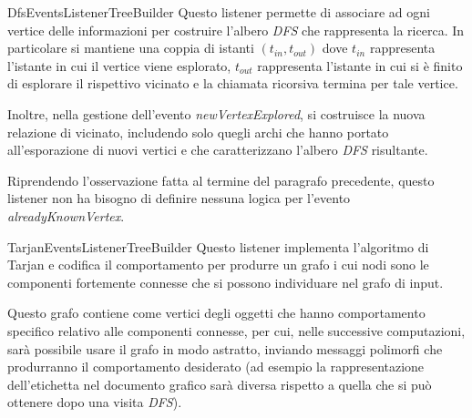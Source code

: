 \begin{paragraph}{DfsEventsListenerTreeBuilder}
  Questo listener permette di associare ad ogni vertice delle
  informazioni per costruire l'albero \emph{DFS} che rappresenta la
  ricerca. In particolare si mantiene una coppia di istanti $(t_{in},
  t_{out})$ dove $t_{in}$ rappresenta l'istante in cui il vertice
  viene esplorato, $t_{out}$ rappresenta l'istante in cui si \`e
  finito di esplorare il rispettivo vicinato e la chiamata ricorsiva
  termina per tale vertice.

  Inoltre, nella gestione dell'evento \emph{newVertexExplored}, si
  costruisce la nuova relazione di vicinato, includendo solo quegli
  archi che hanno portato all'esporazione di nuovi vertici e che
  caratterizzano l'albero \emph{DFS} risultante.

  Riprendendo l'osservazione fatta al termine del paragrafo
  precedente, questo listener non ha bisogno di definire nessuna
  logica per l'evento \emph{alreadyKnownVertex}.
\end{paragraph}

\begin{paragraph}{TarjanEventsListenerTreeBuilder}
  Questo listener implementa l'algoritmo di Tarjan e codifica il
  comportamento per produrre un grafo i cui nodi sono le componenti
  fortemente connesse che si possono individuare nel grafo di
  input. 

  Questo grafo contiene come vertici degli oggetti che hanno
  comportamento specifico relativo alle componenti connesse, per cui,
  nelle successive computazioni, sar\`a possibile usare il grafo in
  modo astratto, inviando messaggi polimorfi che produrranno il
  comportamento desiderato (ad esempio la rappresentazione
  dell'etichetta nel documento grafico sar\`a diversa rispetto a
  quella che si pu\`o ottenere dopo una visita \emph{DFS}).
\end{paragraph}



